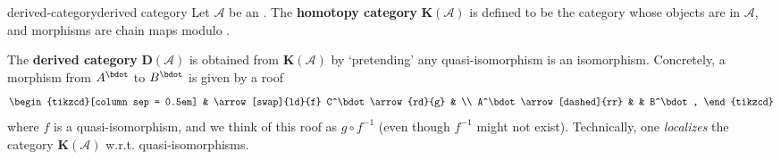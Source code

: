 \begin{topic}{derived-category}{derived category}
    Let $\mathcal{A}$ be an . The \textbf{homotopy category} $\textbf{K}(\mathcal{A})$ is defined to be the category whose objects are  in $\mathcal{A}$, and morphisms are chain maps modulo .
    
    The \textbf{derived category} $\textbf{D}(\mathcal{A})$ is obtained from $\textbf{K}(\mathcal{A})$ by `pretending' any quasi-isomorphism is an isomorphism. Concretely, a morphism from $A^\bdot$ to $B^\bdot$ is given by a roof
    \[ \begin{tikzcd}[column sep = 0.5em] & \arrow[swap]{ld}{f} C^\bdot \arrow{rd}{g} & \\ A^\bdot \arrow[dashed]{rr} & & B^\bdot , \end{tikzcd} \]
    where $f$ is a quasi-isomorphism, and we think of this roof as $g \circ f^{-1}$ (even though $f^{-1}$ might not exist). Technically, one \textit{localizes} the category $\textbf{K}(\mathcal{A})$ w.r.t. quasi-isomorphisms.
\end{topic}



